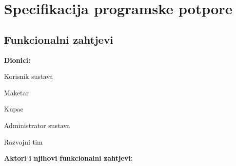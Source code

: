\chapter{Specifikacija programske potpore}
		
	\section{Funkcionalni zahtjevi}
			
			\noindent \textbf{Dionici:}
			
			\begin{packed_enum}
				
				\item Korisnik sustava
				\begin{packed_enum}	
					\item  Maketar 
					\item  Kupac	
				\end{packed_enum}
				\item Administrator	sustava			
				\item Razvojni tim
				
			\end{packed_enum}
			
			\noindent \textbf{Aktori i njihovi funkcionalni zahtjevi:}
			

